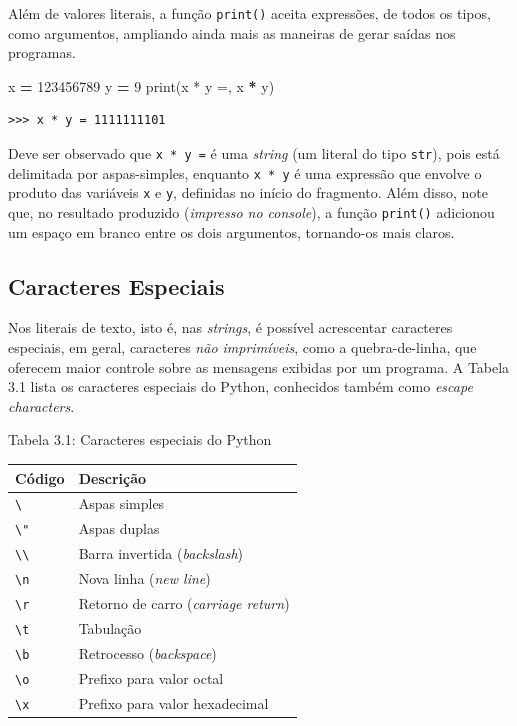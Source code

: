 \documentclass[
]{book}
\newenvironment{Shaded}{\begin{snugshade}}{\end{snugshade}}
\newcommand{\BuiltInTok}[1]{#1}
\newcommand{\DecValTok}[1]{\textcolor[rgb]{0.00,0.00,0.81}{#1}}
\newcommand{\NormalTok}[1]{#1}
\newcommand{\OperatorTok}[1]{\textcolor[rgb]{0.81,0.36,0.00}{\textbf{#1}}}
\newcommand{\StringTok}[1]{\textcolor[rgb]{0.31,0.60,0.02}{#1}}
\begin{document}
Além de valores literais, a função \texttt{print()} aceita expressões, de todos os tipos, como argumentos, ampliando ainda mais as maneiras de gerar saídas nos programas.

\begin{Shaded}
\begin{Highlighting}[]
\NormalTok{x }\OperatorTok{=} \DecValTok{123456789}
\NormalTok{y }\OperatorTok{=} \DecValTok{9}
\BuiltInTok{print}\NormalTok{(}\StringTok{\textquotesingle{}x * y =\textquotesingle{}}\NormalTok{, x }\OperatorTok{*}\NormalTok{ y)}
\end{Highlighting}
\end{Shaded}

\begin{verbatim}
>>> x * y = 1111111101
\end{verbatim}

Deve ser observado que \texttt{\textquotesingle{}x\ *\ y\ =\textquotesingle{}} é uma \emph{string} (um literal do tipo \texttt{str}), pois está delimitada por aspas-simples, enquanto \texttt{x\ *\ y} é uma expressão que envolve o produto das variáveis \texttt{x} e \texttt{y}, definidas no início do fragmento. Além disso, note que, no resultado produzido (\emph{impresso no console}), a função \texttt{print()} adicionou um espaço em branco entre os dois argumentos, tornando-os mais claros.

\hypertarget{e-s-saida-escap}{%
\subsection{Caracteres Especiais}\label{e-s-saida-escap}}

Nos literais de texto, isto é, nas \emph{strings}, é possível acrescentar caracteres especiais, em geral, caracteres \emph{não imprimíveis}, como a quebra-de-linha, que oferecem maior controle sobre as mensagens exibidas por um programa. A Tabela 3.1 lista os caracteres especiais do Python, conhecidos também como \emph{escape characters}.

Tabela 3.1: Caracteres especiais do Python

\begin{longtable}[]{@{}ll@{}}
\toprule
Código & Descrição \\
\midrule
\endhead
\texttt{\textbackslash{}\textquotesingle{}} & Aspas simples \\
\texttt{\textbackslash{}"} & Aspas duplas \\
\texttt{\textbackslash{}\textbackslash{}} & Barra invertida (\emph{backslash}) \\
\texttt{\textbackslash{}n} & Nova linha (\emph{new line}) \\
\texttt{\textbackslash{}r} & Retorno de carro (\emph{carriage return}) \\
\texttt{\textbackslash{}t} & Tabulação \\
\texttt{\textbackslash{}b} & Retrocesso (\emph{backspace}) \\
\texttt{\textbackslash{}o} & Prefixo para valor octal \\
\texttt{\textbackslash{}x} & Prefixo para valor hexadecimal \\
\bottomrule
\end{longtable}
\end{document}

